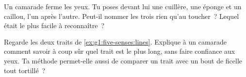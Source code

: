 \begin{exercise}[$\star$]\label{exo:g1:five-senses:8}
Un camarade ferme les yeux. Tu poses devant lui une cuillère, une
éponge et un caillou, l'un après l'autre. Peut-il nommer les trois
rien qu'au toucher~? Lequel était le plus facile à reconnaître~?
\end{exercise}

\begin{exercise}[$\star\star$]\label{exo:g1:five-senses:9}
Regarde les deux traits de \cref{ex:g1:five-senses:lines}. Explique à
un camarade comment savoir à coup sûr quel trait est le plus long,
sans faire confiance aux yeux. Ta méthode permet-elle aussi de
comparer un trait avec un bout de ficelle tout tortillé~?
\end{exercise}
